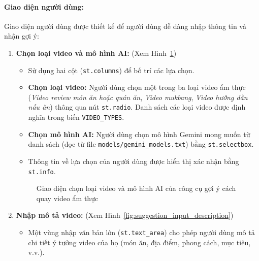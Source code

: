 \paragraph{Giao diện người dùng:} Giao diện người dùng được thiết kế để người dùng dễ dàng nhập thông tin và nhận gợi ý:
\begin{enumerate}
    \item \textbf{Chọn loại video và mô hình AI:} (Xem Hình~\ref{fig:suggestion_choose_video_type_and_model})
    \begin{itemize}
        \item Sử dụng hai cột (\texttt{st.columns}) để bố trí các lựa chọn.

        \item \textbf{Chọn loại video:} Người dùng chọn một trong ba loại video ẩm thực (\textit{Video review món ăn hoặc quán ăn}, \textit{Video mukbang}, \textit{Video hướng dẫn nấu ăn}) thông qua nút \texttt{st.radio}. Danh sách các loại video được định nghĩa trong biến \texttt{VIDEO\_TYPES}.
        
        \item \textbf{Chọn mô hình AI:} Người dùng chọn mô hình Gemini mong muốn từ danh sách (đọc từ file \texttt{models/gemini\_models.txt}) bằng \texttt{st.selectbox}.
        
        \item Thông tin về lựa chọn của người dùng được hiển thị xác nhận bằng \texttt{st.info}.
    \end{itemize}
    \begin{figure}[H]
        \centering
        \caption{Giao diện chọn loại video và mô hình AI của công cụ gợi ý cách quay video ẩm thực}
        \label{fig:suggestion_choose_video_type_and_model}
    \end{figure}

    \item \textbf{Nhập mô tả video:} (Xem Hình~\ref{fig:suggestion_input_description})
    \begin{itemize}
        \item Một vùng nhập văn bản lớn (\texttt{st.text\_area}) cho phép người dùng mô tả chi tiết ý tưởng video của họ (món ăn, địa điểm, phong cách, mục tiêu, v.v.).


\end{itemize}
\end{enumerate}
